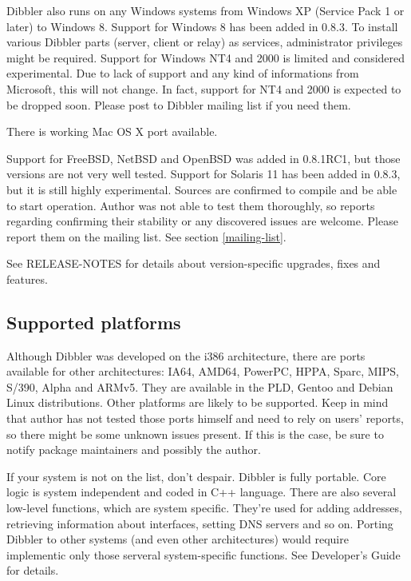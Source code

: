 Dibbler also runs on any Windows systems from Windows XP (Service Pack
1 or later) to Windows 8. Support for Windows 8 has been added in
0.8.3. To install various Dibbler parts (server, client or relay) as
services, administrator privileges might be required. Support for
Windows NT4 and 2000 is limited and considered experimental. Due to
lack of support and any kind of informations from Microsoft, this will
not change. In fact, support for NT4 and 2000 is expected to be
dropped soon. Please post to Dibbler mailing list if you need them.

There is working Mac OS X port available.

Support for FreeBSD, NetBSD and OpenBSD was added in 0.8.1RC1, but
those versions are not very well tested. Support for Solaris 11 has
been added in 0.8.3, but it is still highly experimental. Sources are
confirmed to compile and be able to start operation. Author was not
able to test them thoroughly, so reports regarding confirming their
stability or any discovered issues are welcome. Please report them on
the mailing list. See section \ref{mailing-list}.

See RELEASE-NOTES for details about version-specific upgrades, fixes
and features.

\subsection{Supported platforms}
Although Dibbler was developed on the i386 architecture, there are
ports available for other architectures: IA64, AMD64, PowerPC, HPPA,
Sparc, MIPS, S/390, Alpha and ARMv5. They are available in the PLD,
Gentoo and Debian Linux distributions. Other platforms are likely to
be supported. Keep in mind that author has not tested those ports
himself and need to rely on users' reports, so there might be some
unknown issues present. If this is the case, be sure to notify package
maintainers and possibly the author.

If your system is not on the list, don't despair. Dibbler is fully
portable. Core logic is system independent and coded in C++
language. There are also several low-level functions, which are system
specific. They're used for adding addresses, retrieving information about
interfaces, setting DNS servers and so on. Porting Dibbler to other
systems (and even other architectures) would require implementic only
those serveral system-specific functions. See Developer's Guide for
details.
